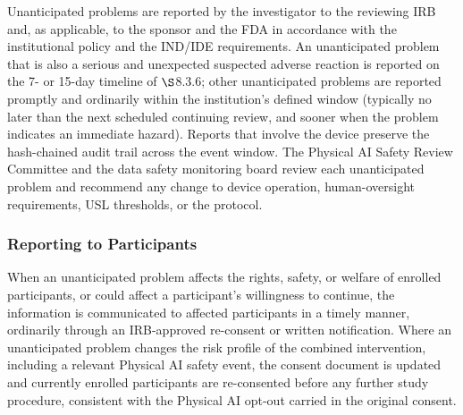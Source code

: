 Unanticipated problems are reported by the investigator to the reviewing IRB and, as
applicable, to the sponsor and the FDA in accordance with the institutional policy
and the IND/IDE requirements. An unanticipated problem that is also a serious and
unexpected suspected adverse reaction is reported on the 7- or 15-day timeline of
$\S$8.3.6; other unanticipated problems are reported promptly and ordinarily within
the institution's defined window (typically no later than the next scheduled
continuing review, and sooner when the problem indicates an immediate hazard).
Reports that involve the device preserve the hash-chained audit trail across the
event window. The Physical AI Safety Review Committee and the data safety monitoring
board review each unanticipated problem and recommend any change to device
operation, human-oversight requirements, USL thresholds, or the protocol.

\subsubsection{Reporting to Participants}

When an unanticipated problem affects the rights, safety, or welfare of enrolled
participants, or could affect a participant's willingness to continue, the
information is communicated to affected participants in a timely manner, ordinarily
through an IRB-approved re-consent or written notification. Where an unanticipated
problem changes the risk profile of the combined intervention, including a relevant
Physical AI safety event, the consent document is updated and currently enrolled
participants are re-consented before any further study procedure, consistent with the
Physical AI opt-out carried in the original consent.
